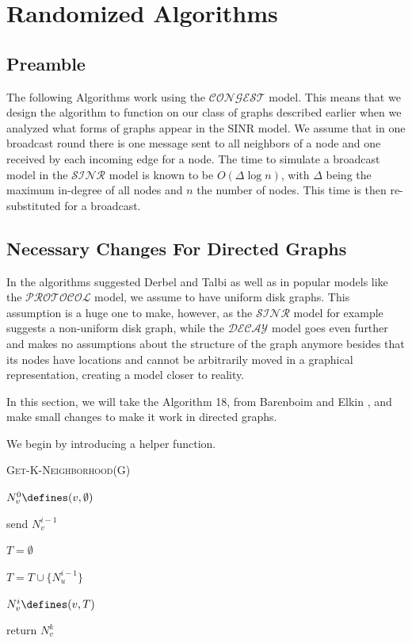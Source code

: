 \chapter{Randomized Algorithms}
\label{ch:randomizedAlgorithms}

\section{Preamble}
The following Algorithms work using the $\mathcal{CONGEST}$ model. This means that we design the algorithm to function on our class of graphs described earlier when we analyzed what forms of graphs appear in the SINR model. We assume that in one broadcast round there is one message sent to all neighbors of a node and one received by each incoming edge for a node. The time to simulate a broadcast model in the $\mathcal{SINR}$ model is known to be $O(\Delta \log{n})$, with $\Delta$ being the maximum in-degree of all nodes and $n$ the number of nodes. This time is then re-substituted for a broadcast.

\section{Necessary Changes For Directed Graphs}
In the algorithms suggested Derbel and Talbi \cite{dt-dncsi-10} as well as in popular models like the $\mathcal{PROTOCOL}$ model, we assume to have uniform disk graphs. This assumption is a huge one to make, however, as the $\mathcal{SINR}$ model for example suggests a non-uniform disk graph, while the $\mathcal{DECAY}$ model goes even further and makes no assumptions about the structure of the graph anymore besides that its nodes have locations and cannot be arbitrarily moved in a graphical representation, creating a model closer to reality.

In this section, we will take the Algorithm 18, from Barenboim and Elkin \cite[p101]{be-dcg-13}, and make small changes to make it work in directed graphs.

We begin by introducing a helper function.


\begin{algorithm}[ht]
\DontPrintSemicolon 
\caption{\textsc{Get-K-Neighborhood(G)}}\label{alg:k-nghbr}

$N^0_v \defines (v, \emptyset)$\;

{


	send $N^{i-1}_v$\;

	$T = \emptyset$ \;

{

$T = T \cup \{N^{i-1}_u\}$\;

$N^{i}_v \defines (v, T)$\;


}


}

return $N^k_v$

\end{algorithm}

